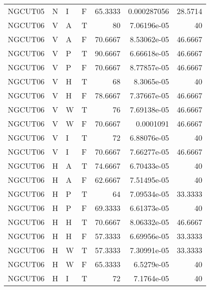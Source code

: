 \begin{longtable}{llllrrr}
    NGCUT05  & N         & I         & F          & 65.3333    & 0.000287056 & 28.5714  \\
    NGCUT06  & V         & A         & T          & 80         & 7.06196e-05 & 40       \\
    NGCUT06  & V         & A         & F          & 70.6667    & 8.53062e-05 & 46.6667  \\
    NGCUT06  & V         & P         & T          & 90.6667    & 6.66618e-05 & 46.6667  \\
    NGCUT06  & V         & P         & F          & 70.6667    & 8.77857e-05 & 46.6667  \\
    NGCUT06  & V         & H         & T          & 68         & 8.3065e-05  & 40       \\
    NGCUT06  & V         & H         & F          & 78.6667    & 7.37667e-05 & 46.6667  \\
    NGCUT06  & V         & W         & T          & 76         & 7.69138e-05 & 46.6667  \\
    NGCUT06  & V         & W         & F          & 70.6667    & 0.0001091   & 46.6667  \\
    NGCUT06  & V         & I         & T          & 72         & 6.88076e-05 & 40       \\
    NGCUT06  & V         & I         & F          & 70.6667    & 7.66277e-05 & 46.6667  \\
    NGCUT06  & H         & A         & T          & 74.6667    & 6.70433e-05 & 40       \\
    NGCUT06  & H         & A         & F          & 62.6667    & 7.51495e-05 & 40       \\
    NGCUT06  & H         & P         & T          & 64         & 7.09534e-05 & 33.3333  \\
    NGCUT06  & H         & P         & F          & 69.3333    & 6.61373e-05 & 40       \\
    NGCUT06  & H         & H         & T          & 70.6667    & 8.06332e-05 & 46.6667  \\
    NGCUT06  & H         & H         & F          & 57.3333    & 6.69956e-05 & 33.3333  \\
    NGCUT06  & H         & W         & T          & 57.3333    & 7.30991e-05 & 33.3333  \\
    NGCUT06  & H         & W         & F          & 65.3333    & 6.5279e-05  & 40       \\
    NGCUT06  & H         & I         & T          & 72         & 7.1764e-05  & 40       \\

\end{longtable}
